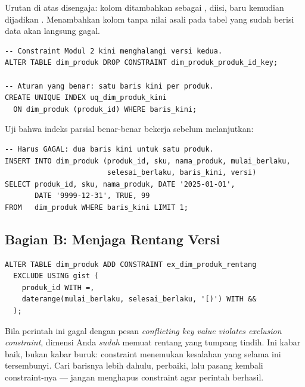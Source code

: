 \begin{catatan}
Urutan di atas disengaja: kolom ditambahkan sebagai ,
diisi, baru kemudian dijadikan . Menambahkan kolom
 tanpa nilai asali pada tabel yang sudah berisi data akan
langsung gagal.
\end{catatan}


\begin{lstlisting}[style=sqlgaya]
-- Constraint Modul 2 kini menghalangi versi kedua.
ALTER TABLE dim_produk DROP CONSTRAINT dim_produk_produk_id_key;

-- Aturan yang benar: satu baris kini per produk.
CREATE UNIQUE INDEX uq_dim_produk_kini
  ON dim_produk (produk_id) WHERE baris_kini;
\end{lstlisting}

Uji bahwa indeks parsial benar-benar bekerja sebelum melanjutkan:

\begin{lstlisting}[style=sqlgaya]
-- Harus GAGAL: dua baris kini untuk satu produk.
INSERT INTO dim_produk (produk_id, sku, nama_produk, mulai_berlaku,
                        selesai_berlaku, baris_kini, versi)
SELECT produk_id, sku, nama_produk, DATE '2025-01-01',
       DATE '9999-12-31', TRUE, 99
FROM   dim_produk WHERE baris_kini LIMIT 1;
\end{lstlisting}

\subsection{Bagian B: Menjaga Rentang Versi}


\begin{lstlisting}[style=sqlgaya]
ALTER TABLE dim_produk ADD CONSTRAINT ex_dim_produk_rentang
  EXCLUDE USING gist (
    produk_id WITH =,
    daterange(mulai_berlaku, selesai_berlaku, '[)') WITH &&
  );
\end{lstlisting}

\begin{peringatan}
Bila perintah ini gagal dengan pesan \emph{conflicting key value violates
exclusion constraint}, dimensi Anda \emph{sudah} memuat rentang yang tumpang
tindih. Ini kabar baik, bukan kabar buruk: constraint menemukan kesalahan yang
selama ini tersembunyi. Cari barisnya lebih dahulu, perbaiki, lalu pasang
kembali constraint-nya --- jangan menghapus constraint agar perintah berhasil.
\end{peringatan}

